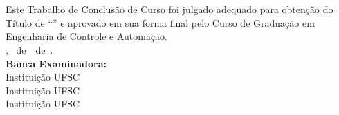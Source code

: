 \imprimircapa


\imprimirfolhaderosto*

\begin{fichacatalografica}
	
\end{fichacatalografica}

\begin{folhadeaprovacao}
	\OnehalfSpacing
	\centering
	\imprimirautor\\%
	\vspace{24pt}		
	\textbf{\imprimirtitulo}%
	\ifnotempty{\imprimirsubtitulo}{:~\imprimirsubtitulo}\\%
	\vspace*{\baselineskip}
	Este Trabalho de Conclusão de Curso foi julgado adequado para obtenção do Título de ``\imprimirformacao'' e aprovado em sua forma final pelo Curso de Graduação em Engenharia de Controle e Automação.\\
	\vspace{12pt}
	\imprimirlocal, \imprimirdia~de~\imprimirmes~de~\imprimirano.\\
	
	\vspace*{18pt}
	\textbf{Banca Examinadora:}\\
	
	\vspace*{24pt}
	\assinatura{\OnehalfSpacing \imprimirbancaa}
	\vspace{6pt}
	Instituição UFSC\\
	
	\vspace*{24pt}
	\assinatura{\OnehalfSpacing \imprimirbancab}
	\vspace{6pt}
	Instituição UFSC\\
	
	\vspace*{24pt}
	\assinatura{\OnehalfSpacing \imprimirbancac}
	\vspace{6pt}
	Instituição UFSC\\
	
\end{folhadeaprovacao}

\ifnotempty{\imprimirdedicatoriatcc}{
\begin{dedicatoria}
	\vspace*{\fill}
	\noindent
	\begin{adjustwidth*}{}{5.5cm} 
		\raggedleft       
		\imprimirdedicatoriatcc
	\end{adjustwidth*}
\end{dedicatoria}
}

